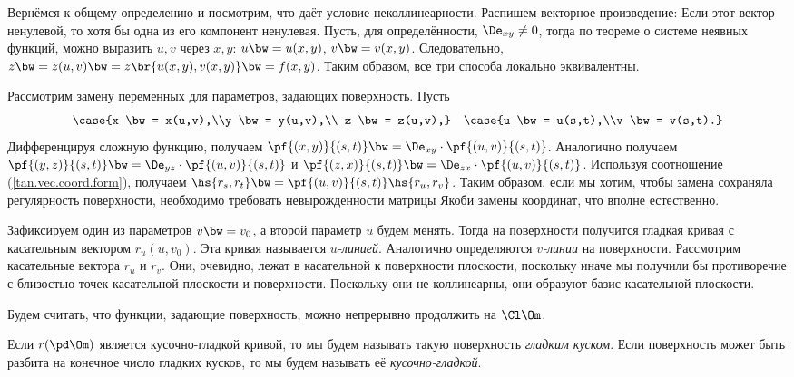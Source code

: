 \documentclass[a4paper]{article}
\begin{document}
Вернёмся к общему определению и посмотрим, что даёт условие неколлинеарности. Распишем векторное
произведение:  Если этот вектор ненулевой, то хотя бы одна из его
компонент ненулевая. Пусть, для определённости, $\De_{xy} \neq 0$, тогда по теореме о системе неявных
функций, можно выразить $u,v$ через $x,y$: $u \bw= u(x,y)$, $v \bw= v(x,y)$. Следовательно, $z \bw= z(u,v)
\bw= z\br{u(x,y), v(x,y)}\bw=f(x,y)$. Таким образом, все три способа локально эквивалентны.

Рассмотрим замену переменных для параметров, задающих поверхность. Пусть
$$
  \case{x \bw= x(u,v),\\y \bw= y(u,v),\\ z \bw= z(u,v),} \quad \case{u \bw= u(s,t),\\v \bw= v(s,t).}
$$
Дифференцируя сложную функцию, получаем $\pf{(x,y)}{(s,t)} \bw= \De_{xy}\cdot \pf{(u,v)}{(s,t)}$.
Аналогично получаем $\pf{(y,z)}{(s,t)} \bw= \De_{yz}\cdot \pf{(u,v)}{(s,t)}$ и $\pf{(z,x)}{(s,t)} \bw=
\De_{zx}\cdot\pf{(u,v)}{(s,t)}$. Используя соотношение (\ref{tan.vec.coord.form}), получаем
$\hs{r_s, r_t} \bw= \pf{(u,v)}{(s,t)} \hs{r_u, r_v}$. Таким образом, если мы хотим, чтобы замена
сохраняла регулярность поверхности, необходимо требовать невырожденности матрицы Якоби замены координат,
что вполне естественно.

Зафиксируем один из параметров $v \bw= v_0$, а второй параметр $u$ будем менять. Тогда на поверхности
получится гладкая кривая с касательным вектором $r_u(u,v_0)$. Эта кривая называется \emph{$u$-линией}.
Аналогично определяются \emph{$v$-линии} на поверхности. Рассмотрим касательные вектора $r_u$ и $r_v$.
Они, очевидно, лежат в касательной к поверхности плоскости, поскольку иначе мы получили бы противоречие с
близостью точек касательной плоскости и поверхности. Поскольку они не коллинеарны, они образуют базис
касательной плоскости.

Будем считать, что функции, задающие поверхность, можно непрерывно продолжить на $\Cl \Om$.

\begin{df}
Если $r(\pd \Om)$ является кусочно-гладкой кривой, то мы будем называть такую поверхность \emph{гладким куском}.
Если поверхность может быть разбита на конечное число гладких кусков, то мы будем называть её \emph{кусочно-гладкой}.
\end{df}
\end{document}
